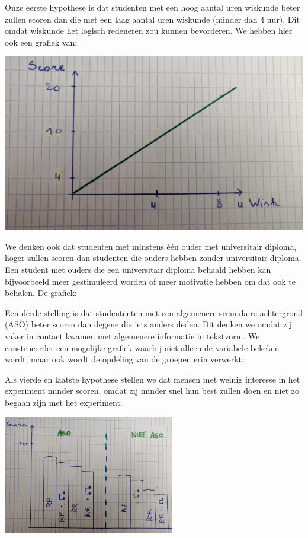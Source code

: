 \documentclass{voorstel}
\begin{document}
    Onze eerste hypothese is dat studenten met een hoog aantal uren wiskunde beter zullen scoren dan die met een laag aantal uren wiskunde (minder dan 4 uur). Dit omdat wiskunde het logisch redeneren zou kunnen bevorderen.
    We hebben hier ook een grafiek van:
	
		\includegraphics[width=\linewidth]{img/imgg1.jpg}

	
	
    
    We denken ook dat studenten met minstens één ouder met universitair diploma, hoger zullen scoren dan studenten die ouders hebben zonder universitair diploma. 
    Een student met ouders die een universitair diploma behaald hebben kan bijvoorbeeld meer gestimuleerd worden of meer motivatie hebben om dat ook te behalen. 
    De grafiek:
    
    Een derde stelling is dat studententen met een algemenere secundaire achtergrond (ASO) beter scoren dan degene die iets anders deden. Dit denken we omdat zij vaker in contact kwamen met algemenere informatie in tekstvorm. We construeerder een mogelijke grafiek waarbij niet alleen de variabele bekeken wordt, maar ook wordt de opdeling van de groepen erin verwerkt:
    
    Als vierde en laatste hypothese stellen we dat mensen met weinig interesse in het experiment minder scoren, omdat zij minder snel hun best zullen doen en niet zo begaan zijn met het experiment.
	

	
	\includegraphics[width=7.5cm]{img/imgg2.jpg}
	
\end{document}
